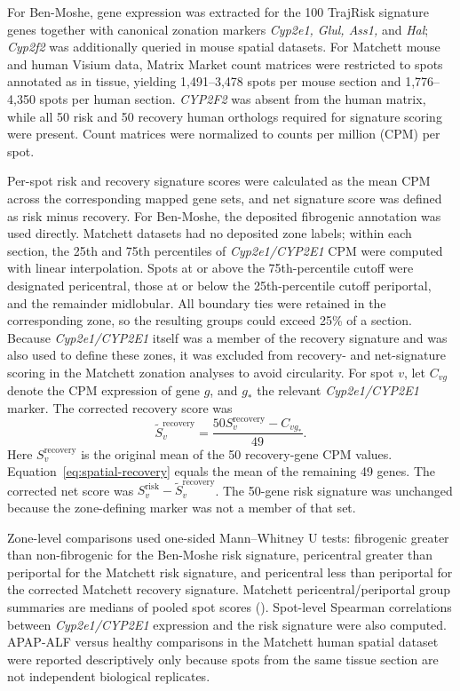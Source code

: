 For Ben-Moshe, gene expression was extracted for the 100 TrajRisk signature genes together with canonical zonation markers \textit{Cyp2e1, Glul, Ass1,} and \textit{Hal}; \textit{Cyp2f2} was additionally queried in mouse spatial datasets. For Matchett mouse and human Visium data, Matrix Market count matrices were restricted to spots annotated as in tissue, yielding 1,491--3,478 spots per mouse section and 1,776--4,350 spots per human section. \textit{CYP2F2} was absent from the human matrix, while all 50 risk and 50 recovery human orthologs required for signature scoring were present. Count matrices were normalized to counts per million (CPM) per spot.

Per-spot risk and recovery signature scores were calculated as the mean CPM across the corresponding mapped gene sets, and net signature score was defined as risk minus recovery. For Ben-Moshe, the deposited fibrogenic annotation was used directly. Matchett datasets had no deposited zone labels; within each section, the 25th and 75th percentiles of \textit{Cyp2e1/CYP2E1} CPM were computed with linear interpolation. Spots at or above the 75th-percentile cutoff were designated pericentral, those at or below the 25th-percentile cutoff periportal, and the remainder midlobular. All boundary ties were retained in the corresponding zone, so the resulting groups could exceed 25\% of a section. Because \textit{Cyp2e1/CYP2E1} itself was a member of the recovery signature and was also used to define these zones, it was excluded from recovery- and net-signature scoring in the Matchett zonation analyses to avoid circularity. For spot \(v\), let \(C_{vg}\) denote the CPM expression of gene \(g\), and \(g_*\) the relevant \textit{Cyp2e1/CYP2E1} marker. The corrected recovery score was
\begin{equation}\label{eq:spatial-recovery}
\widetilde S_v^{\mathrm{recovery}}=
\frac{50S_v^{\mathrm{recovery}}-C_{vg_*}}{49}.
\end{equation}
Here \(S_v^{\mathrm{recovery}}\) is the original mean of the 50 recovery-gene CPM values. Equation~\eqref{eq:spatial-recovery} equals the mean of the remaining 49 genes. The corrected net score was \(S_v^{\mathrm{risk}}-\widetilde S_v^{\mathrm{recovery}}\). The 50-gene risk signature was unchanged because the zone-defining marker was not a member of that set.

Zone-level comparisons used one-sided Mann--Whitney U tests: fibrogenic greater than non-fibrogenic for the Ben-Moshe risk signature, pericentral greater than periportal for the Matchett risk signature, and pericentral less than periportal for the corrected Matchett recovery signature. Matchett pericentral/periportal group summaries are medians of pooled spot scores (). Spot-level Spearman correlations between \textit{Cyp2e1/CYP2E1} expression and the risk signature were also computed. APAP-ALF versus healthy comparisons in the Matchett human spatial dataset were reported descriptively only because spots from the same tissue section are not independent biological replicates.


